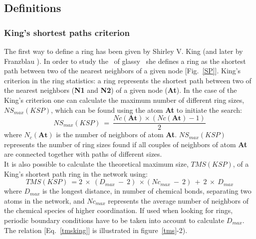 \subsection{Definitions}
\label{defrings}

\subsubsection{King's shortest paths criterion}
\label{sking}

The first way to define a ring has been given by Shirley V. King \cite{Nature.213.1112} (and later by Franzblau \cite{PhysRevB.44.4925}). 
In order to study the \con\ of glassy \sio\ she defines a ring as the shortest path between two of the nearest neighbors of a given node [Fig.~\ref{SP}]. 
{King's criterion in the ring statistics: a ring represents the shortest path between two of the nearest neighbors ({\bf{N1}} and {\bf{N2}}) of a given node ({\bf{At}}).}
\laf In the case of the King's criterion one can calculate the maximum number of different ring sizes, $NS_{max}(KSP)$, which can be found using the atom {\bf{At}} to initiate the search:
\begin{equation}
\label{lmaxsp}
	NS_{max}(KSP)\ =\ \frac{Nc({\textbf{At}}) \times (Nc({\textbf{At}})-1)}{2}
\end{equation}
where $ N_c({\textbf{At}})$ is the number of neighbors of atom {\bf{At}}. 
$NS_{max}(KSP)$ represents the number of ring sizes found if all couples of neighbors of atom {\bf{At}} are connected together with paths of different sizes. \\
It is also possible to calculate the theoretical maximum size, $TMS(KSP)$, of a King's shortest path ring in the network using:
\begin{equation}
\label{tmsking}
TMS(KSP)\ = 2\ \times\ (D_{max}\ -\ 2)\ \times (Nc_{max}\ -\ 2)\ +\ 2\ \times\ D_{max}
\end{equation}
where $D_{max}$ is the longest distance, in number of chemical bonds, separating two atoms in the network, and $Nc_{max}$ represents the average number of neighbors of the chemical species of higher coordination. 
If used when looking for rings, periodic boundary conditions have to be taken into account to calculate $D_{max}$. 
The relation [Eq.~\ref{tmsking}] is illustrated in figure~\ref{tms}-2).


